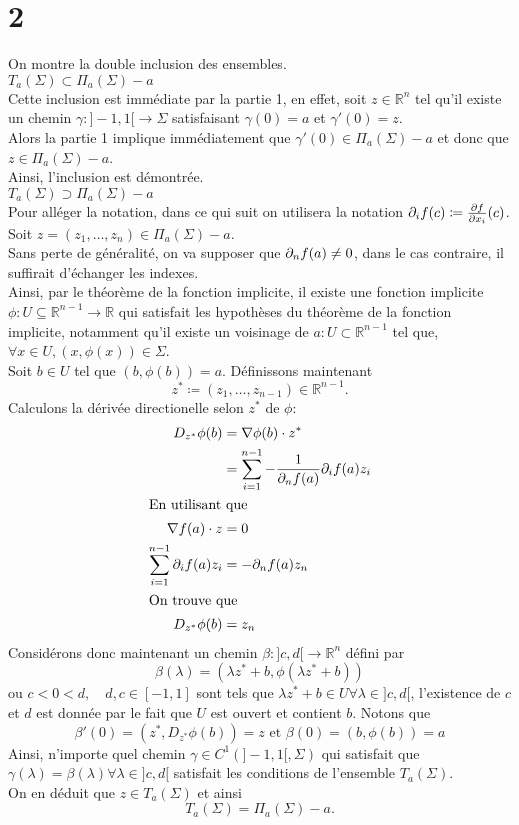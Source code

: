 \documentclass[11pt, a4paper]{article}
\begin{document}
\section*{2}
On montre la double inclusion des ensembles.\\
\hr
\textbf{ $ T_a( \Sigma) \subset \Pi_a( \Sigma) - a$ }\\
Cette inclusion est immédiate par la partie 1, en effet, soit $z \in \mathbb{R}^n$ tel qu'il existe un chemin $\gamma:]-1,1[ \to \Sigma$ satisfaisant $\gamma( 0) = a$ et $\gamma'( 0) = z$.\\
Alors la partie 1 implique immédiatement que $\gamma'( 0) \in \Pi_a( \Sigma) -a$ et donc que $z \in \Pi_a( \Sigma) -a$.\\
Ainsi, l'inclusion est démontrée.\\
\hr
\textbf{ $ T_a( \Sigma) \supset \Pi_a( \Sigma) - a$ }\\
Pour alléger la notation, dans ce qui suit on utilisera la notation $ \partial_i f( c) \coloneqq \frac{\partial f}{\partial x_i}( c) $.\\
Soit $z= ( z_1,\ldots,z_n) \in \Pi_a( \Sigma) -a$.\\
Sans perte de généralité, on va supposer que $\partial_n f ( a) \neq 0$, dans le cas contraire, il suffirait d'échanger les indexes.\\
Ainsi, par le théorème de la fonction implicite, il existe une fonction implicite $\phi : U \subseteq \mathbb{R}^{n-1}\to \mathbb{R}$ qui satisfait les hypothèses du théorème de la fonction implicite, notamment qu'il existe un voisinage de $a : U\subset \mathbb{R}^{n-1}$ tel que, $\forall x \in U, ( x,\phi( x) ) \in \Sigma$.\\
Soit $b \in U$ tel que $( b, \phi( b) ) = a$.
Définissons maintenant
\[ 
	z^{*} \coloneqq ( z_1, \ldots, z_{n-1} )  \in \mathbb{R}^{n-1}.
\]
Calculons la dérivée directionelle selon $z^{*}$ de $\phi $:
\begin{align*}
	D_{z^{*}} \phi( b) &= \nabla \phi( b) \cdot z^{*}\\
			   &= \sum_{i=1} ^{n-1} - \frac{1}{\partial_n f( a) } \partial_i f( a) z_i \\
			   \intertext{En utilisant que }
			   \nabla f ( a) \cdot z &= 0\\
			   \sum_{i=1}^{ n-1}  \partial_i f( a) z_i &= - \partial_n f( a) z_n\\
			   \intertext{On trouve que }
			   D_{z^{*}} \phi( b)  &= z_n
\end{align*}
Considérons donc maintenant un chemin $\beta :]c,d[\to \mathbb{R}^{n}$ défini par
\[ 
	\beta( \lambda) = \left( \lambda z^{*}+ b, \phi( \lambda z^{*}+ b) \right) 
\]
ou $c<0< d, \quad d,c \in [-1,1]$ sont tels que $\lambda z^{*}+b \in U \forall \lambda \in ]c,d[$, l'existence de $c$ et $d$ est donnée par le fait que $U$ est ouvert et contient $b$.
Notons que
\[ 
	\beta'( 0) = \left( z^{*}, D_{z^{*}}\phi( b)  \right) = z \text{ et } \beta( 0) = \left( b,\phi( b) 	 \right) = a
\]
Ainsi, n'importe quel chemin $\gamma \in C^{1}( ]-1,1[ , \Sigma) $  qui satisfait que $\gamma( \lambda) = \beta( \lambda) \forall \lambda \in ]c,d[$ satisfait les conditions de l'ensemble $T_a( \Sigma) $.\\
On en déduit que $z \in T_a( \Sigma) $ et ainsi
\[ 
	T_a( \Sigma) = \Pi_a( \Sigma) -a.
\]
\end{document}
